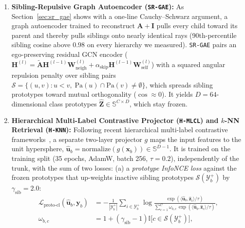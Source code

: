 \documentclass[preprint,12pt]{elsarticle}
\begin{document}
\begin{enumerate}[leftmargin=*,nosep]
  \item \textbf{Sibling-Repulsive Graph Autoencoder (\texttt{SR-GAE}):} As
    Section~\ref{sec:sr_gae} shows with a one-line Cauchy--Schwarz argument,
    a graph autoencoder trained to reconstruct $\mathbf{A}+\mathbf{I}$ pulls
    every child toward its parent and thereby pulls siblings onto nearly
    identical rays (90th-percentile sibling cosine above $0.98$ on every
    hierarchy we measured). \texttt{SR-GAE} pairs an ego-preserving
    residual GCN encoder ($\mathbf{H}^{(l)} = \tilde{\mathbf{A}}\mathbf{H}^{(l-1)}
    \mathbf{W}_{\text{neigh}}^{(l)} + \alpha_{\text{skip}}\mathbf{H}^{(l-1)}
    \mathbf{W}_{\text{self}}^{(l)}$) with a squared angular repulsion penalty over
    sibling pairs $\mathcal{S} = \{(u,v) : u < v,\; \text{Pa}(u)\cap\text{Pa}(v)
    \neq \emptyset\}$, which spreads sibling prototypes toward mutual
    orthogonality ($\cos \approx 0$). It yields $D{=}64$-dimensional class
    prototypes $\hat{\mathbf{Z}} \in \mathbb{S}^{C \times D}$, which stay frozen.
  \item \textbf{Hierarchical Multi-Label Contrastive Projector (\texttt{H-MLCL})
    and $k$-NN Retrieval (\texttt{H-KNN}):} Following recent hierarchical
    multi-label contrastive frameworks~\cite{himulcone2022,hill2024,mlclknn2024},
    a separate two-layer projector $g$ maps the input features to the unit
    hypersphere, $\hat{\mathbf{u}}_b = \text{normalize}(g(\mathbf{x}_b)) \in
    \mathbb{S}^{D-1}$. It is trained on the training split (35 epochs, AdamW,
    batch 256, $\tau = 0.2$), independently of the trunk, with the sum of two
    losses:
    (a) a \emph{prototype InfoNCE loss} against the frozen prototypes that
    up-weights inactive sibling prototypes $\mathcal{S}(\mathcal{Y}_b^+)$ by
    $\gamma_{\text{sib}} = 2.0$:
    \begin{equation}
    \begin{split}
    \mathcal{L}_{\text{proto-cl}}(\hat{\mathbf{u}}_b, \mathbf{y}_b)
    &= -\frac{1}{|\mathcal{Y}_b^+|} \sum_{i \in \mathcal{Y}_b^+} \log
    \frac{\exp(\langle \hat{\mathbf{u}}_b, \hat{\mathbf{z}}_i \rangle / \tau)}
    {\sum_{c=1}^{C} \omega_{b,c}\,\exp(\langle \hat{\mathbf{u}}_b, \hat{\mathbf{z}}_c \rangle / \tau)},\\
    \omega_{b,c} &= 1 + (\gamma_{\text{sib}}-1)\mathbb{I}\bigl[c \in \mathcal{S}(\mathcal{Y}_b^+)\bigr],
    \end{split}
    \label{eq:proto_cl}
    \end{equation}

\end{enumerate}
\end{document}
